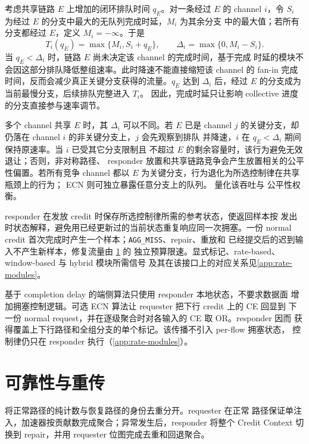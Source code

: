 考虑共享链路 $E$ 上增加的闭环排队时间 $q_E$。对一条经过 $E$ 的 channel
$i$，令 $S_i$ 为经过 $E$ 的分支中最大的无队列完成时延，$M_i$ 为其余分支
中的最大值；若所有分支都经过 $E$，定义 $M_i=-\infty$。于是
\begin{equation}
    T_i(q_E)=\max\{M_i,S_i+q_E\},\qquad
    \Delta_i=\max\{0,M_i-S_i\}.
    \label{eq:branch-slack}
\end{equation}
当 $q_E<\Delta_i$ 时，链路 $E$ 尚未决定该 channel 的完成时间，基于完成
时延的模块不会因这部分排队降低整组速率。此时降速不能直接缩短该 channel
的 fan-in 完成时间，反而会减少真正关键分支获得的流量。$q_E$ 达到
$\Delta_i$ 后，经过 $E$ 的分支成为当前最慢分支，后续排队完整进入 $T_i$。
因此，完成时延只让影响 collective 进度的分支直接参与速率调节。

多个 channel 共享 $E$ 时，其 $\Delta_i$ 可以不同。若 $E$ 已是 channel
$j$ 的关键分支，却仍落在 channel $i$ 的非关键分支上，$j$ 会先观察到排队
并降速，$i$ 在 $q_E<\Delta_i$ 期间保持原速率。当 $i$ 已受其它分支限制且
不超过 $E$ 的剩余容量时，该行为避免无效退让；否则，非对称路径、
responder 放置和共享链路竞争会产生放置相关的公平性偏置。若所有竞争
channel 都以 $E$ 为关键分支，行为退化为所选控制律在共享瓶颈上的行为；
ECN 则可独立暴露任意分支上的队列。 量化该吞吐与
公平性权衡。

responder 在发放 credit 时保存所选控制律所需的参考状态，使返回样本按
发出时状态解释，避免用已经更新过的当前状态重复响应同一次拥塞。一份
normal credit 首次完成时产生一个样本；\texttt{AGG\_MISS}、repair、重放和
已经提交后的迟到输入不产生新样本，修复流量由 \cref{ssec:reliability} 的
独立预算限速。显式标记、rate-based、window-based 与 hybrid 模块所需信号
及其在该接口上的对应关系见\cref{app:rate-modules}。

基于 completion delay 的端侧算法只使用 responder 本地状态，不要求数据面
增加拥塞控制逻辑。可选 ECN 算法让 requester 把下行 credit 上的 CE 回显到
下一份 normal request，并在逐级聚合时对各输入的 CE 取 OR。responder 因而
获得覆盖上下行路径和全组分支的单个标记。该传播不引入 per-flow 拥塞状态，
控制律仍只在 responder 执行（\cref{app:rate-modules}）。

\section{可靠性与重传}
\label{ssec:reliability}

\sysname 将正常路径的纯计数与恢复路径的身份去重分开。requester 在正常
路径保证单注入，加速器按贡献数完成聚合；异常发生后，responder 将整个
Credit Context 切换到 repair，并用 requester 位图完成去重和回退聚合。

